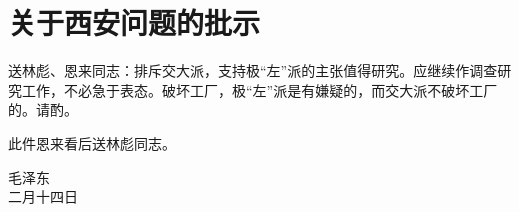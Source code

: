 \section[关于西安问题的批示（一九六七年二月十四日）]{关于西安问题的批示}


送林彪、恩来同志：排斥交大派，支持极“左”派的主张值得研究。应继续作调查研究工作，不必急于表态。破坏工厂，极“左”派是有嫌疑的，而交大派不破坏工厂的。请酌。

此件恩来看后送林彪同志。
{\raggedleft 毛泽东\\二月十四日\par}


